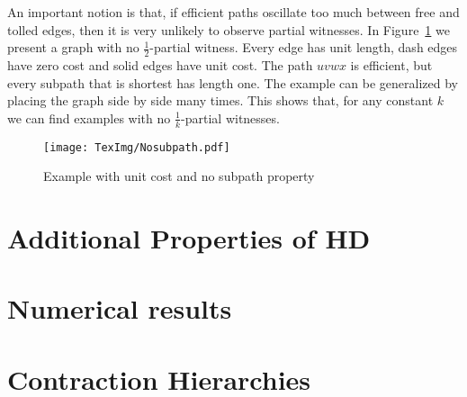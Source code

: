 \documentclass[letterpaper,11pt]{article}
\theoremstyle{plain}
\begin{document}
An important notion is that, if efficient paths oscillate too much between free and tolled edges, then it is very unlikely to observe partial witnesses.
In Figure~\ref{fig:nosubpath} we present a graph with no $\frac{1}{2}$-partial witness.
Every edge has unit length, dash edges have zero cost and solid edges have unit cost.
The path $uvwx$ is efficient, but every subpath that is shortest has length one.
The example can be generalized by placing the graph side by side many times.
This shows that, for any constant $k$ we can find examples with no $\frac{1}{k}$-partial witnesses.


\begin{figure}
\caption{Example with unit cost and no subpath property}
\label{fig:nosubpath}
\centering
\texttt{[image: TexImg/Nosubpath.pdf]}
\end{figure}

\section{Additional Properties of  HD}


\section{Numerical results}



\section{Contraction Hierarchies}




\end{document}
